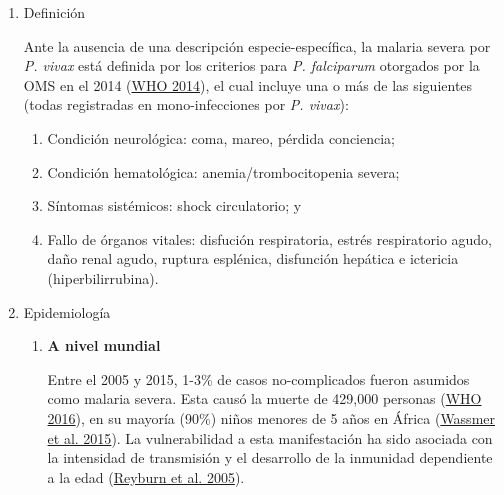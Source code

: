 \documentclass[
  a4paper]{article}
\providecommand{\tightlist}{%
  \setlength{\itemsep}{0pt}\setlength{\parskip}{0pt}}
\begin{document}
\begin{enumerate}
\def\labelenumi{\alph{enumi}.}
\item
  Definición

  Ante la ausencia de una descripción especie-específica, la malaria
  severa por \emph{P. vivax} está definida por los criterios para
  \emph{P. falciparum} otorgados por la OMS en el 2014
  (\protect\hyperlink{ref-WHO2014severe}{WHO 2014}), el cual incluye una
  o más de las siguientes (todas registradas en mono-infecciones por
  \emph{P. vivax}):

  \begin{enumerate}
  \def\labelenumii{\arabic{enumii}.}
  \tightlist
  \item
    Condición neurológica: coma, mareo, pérdida conciencia;
  \item
    Condición hematológica: anemia/trombocitopenia severa;
  \item
    Síntomas sistémicos: shock circulatorio; y
  \item
    Fallo de órganos vitales: disfución respiratoria, estrés
    respiratorio agudo, daño renal agudo, ruptura esplénica, disfunción
    hepática e ictericia (hiperbilirrubina).
  \end{enumerate}
\item
  Epidemiología

  \begin{enumerate}
  \def\labelenumii{\roman{enumii}.}
  \item
    \textbf{A nivel mundial}

    Entre el 2005 y 2015, 1-3\% de casos no-complicados fueron asumidos
    como malaria severa. Esta causó la muerte de 429,000 personas
    (\protect\hyperlink{ref-WHO2016world}{WHO 2016}), en su mayoría
    (90\%) niños menores de 5 años en África
    (\protect\hyperlink{ref-wassmer2015}{Wassmer et al. 2015}). La
    vulnerabilidad a esta manifestación ha sido asociada con la
    intensidad de transmisión y el desarrollo de la inmunidad
    dependiente a la edad (\protect\hyperlink{ref-reyburn2015}{Reyburn
    et al. 2005}).


\end{enumerate}
\end{enumerate}
\end{document}
